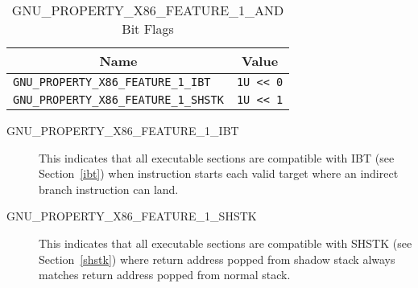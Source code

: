 \begin{table}[H]
\Hrule
  \caption{GNU_PROPERTY_X86_FEATURE_1_AND Bit Flags}
  \begin{center}
    \begin{tabular}[t]{l|l}
      \multicolumn{1}{c}{Name} & \multicolumn{1}{c}{Value} \\
      \hline
     \texttt{GNU_PROPERTY_X86_FEATURE_1_IBT} & \texttt{1U << 0} \\
     \texttt{GNU_PROPERTY_X86_FEATURE_1_SHSTK} & \texttt{1U << 1} \\
    \end{tabular}
  \end{center}
\Hrule
\end{table}

\begin{description}
 \item[GNU_PROPERTY_X86_FEATURE_1_IBT] This indicates that all executable
   sections are compatible with IBT (see Section~\ref{ibt}) when
    instruction starts each valid target where an indirect
   branch instruction can land.
 \item[GNU_PROPERTY_X86_FEATURE_1_SHSTK] This indicates that all
   executable sections are compatible with SHSTK (see Section~\ref{shstk})
   where return address popped from shadow stack always matches return
   address popped from normal stack.
\end{description}

